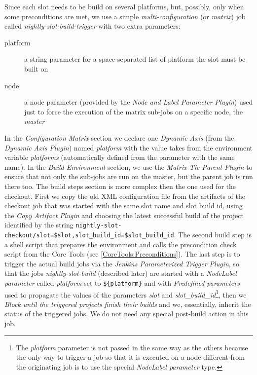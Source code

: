 \documentclass{lhcbnote}
\begin{document}
Since each slot needs to be build on several platforms, but, possibly, only when
some preconditions are met, we use a simple \emph{multi-configuration} (or
\emph{matrix}) job called \emph{nightly-slot-build-trigger} with two extra
parameters:
\begin{description}
  \item[platform] a string parameter for a space-separated list of platform the
slot must be built on
  \item[node] a node parameter (provided by the \emph{Node and Label Parameter
Plugin}) used just to force the execution of the matrix sub-jobs on a specific
node, the \emph{master}
\end{description}
In the \emph{Configuration Matrix} section we declare one \emph{Dynamic Axis}
(from the \emph{Dynamic Axis Plugin}) named \emph{platform} with the value takes
from the environment variable \emph{platforms} (automatically defined from the
parameter with the same name).  In the \emph{Build Environment} section, we use
the \emph{Matrix Tie Parent Plugin} to ensure that not only the sub-jobs are run
on the master, but the parent job is run there too.  The build steps section is
more complex then the one used for the checkout.  First we copy the old XML
configuration file from the artifacts of the checkout job that was started with
the same slot name and slot build id, using the \emph{Copy Artifact Plugin} and
choosing the latest successful build of the project identified by the string
\verb|nightly-slot-checkout/slot=$slot,slot_build_id=$slot_build_id|.  The
second build step is a shell script that prepares the environment and calls the
precondition check script from the Core Tools (see
\ref{CoreTools:Preconditions}).  The last step is to trigger the actual build
jobs via the \emph{Jenkins Parameterized Trigger Plugin}, so that the jobs
\emph{nightly-slot-build} (described later) are started with a \emph{NodeLabel
parameter} called \emph{platform} set to \verb|${platform}| and with
\emph{Predefined parameters} used to propagate the values of the parameters
\emph{slot} and \emph{slot\_build\_id}\footnote{The \emph{platform} parameter is
  not passed in the same way as the others because the only way to trigger a job
  so that it is executed on a node different from the originating job is to use
  the special \emph{NodeLabel parameter} type.},
then we \emph{Block until the triggered projects finish their builds} and we,
essentially, inherit the status of the triggered jobs.  We do not need any
special post-build action in this job.
\end{document}
